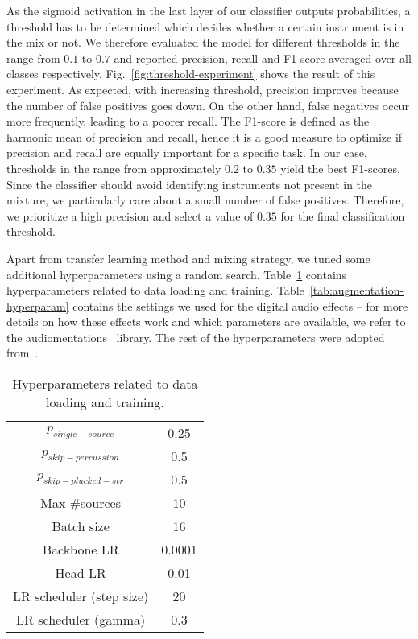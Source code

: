 As the sigmoid activation in the last layer of our classifier outputs probabilities, a threshold has to be determined which decides whether a certain instrument is in the mix or not. We therefore evaluated the model for different thresholds in the range from $0.1$ to $0.7$ and reported precision, recall and F1-score averaged over all classes respectively. Fig.~\ref{fig:threshold-experiment} shows the result of this experiment. As expected, with increasing threshold, precision improves because the number of false positives goes down. On the other hand, false negatives occur more frequently, leading to a poorer recall. The F1-score is defined as the harmonic mean of precision and recall, hence it is a good measure to optimize if precision and recall are equally important for a specific task. In our case, thresholds in the range from approximately $0.2$ to $0.35$ yield the best F1-scores. Since the classifier should avoid identifying instruments not present in the mixture, we particularly care about a small number of false positives. Therefore, we prioritize a high precision and select a value of $0.35$ for the final classification threshold.

Apart from transfer learning method and mixing strategy, we tuned some additional hyperparameters using a random search. Table~\ref{tab:other-hyperparam} contains hyperparameters related to data loading and training. Table~\ref{tab:augmentation-hyperparam} contains the settings we used for the digital audio effects -- for more details on how these effects work and which parameters are available, we refer to the audiomentations~\cite{audiomentations} library. The rest of the hyperparameters were adopted from~\cite{won2020evaluation}.\\

\begin{table}[]
	\centering
	\begin{tabular}{c|c}
		&   \\ \hline
		$p_{single-source}$  & 0.25 \\ \hline
		$p_{skip-percussion}$  &  0.5 \\ \hline
		$p_{skip-plucked-str}$  &  0.5  \\ \hline
		Max \#sources &  10 \\ \hline
		Batch size & 16 \\ \hline
		Backbone LR	& 0.0001 \\ \hline
		Head LR	&  0.01 \\ \hline
		LR scheduler (step size) & 20 \\ \hline
		LR scheduler (gamma) &  0.3  \\
	\end{tabular}
	\caption{Hyperparameters related to data loading and training.}
	\label{tab:other-hyperparam}
\end{table}

